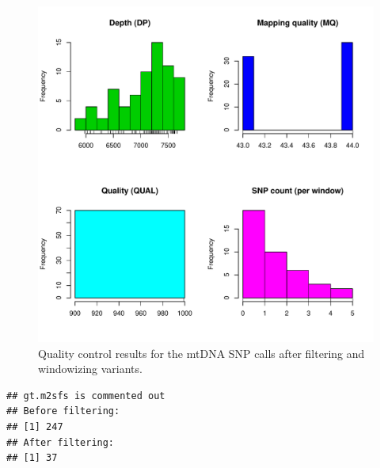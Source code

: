 \documentclass{article}\usepackage[]{graphicx}\usepackage[]{color}
\makeatletter
\def\maxwidth{ %
  \ifdim\Gin@nat@width>\linewidth
    \linewidth
  \else
    \Gin@nat@width
  \fi
}
\newenvironment{kframe}{%
 \def\at@end@of@kframe{}%
 \ifinner\ifhmode%
  \def\at@end@of@kframe{\end{minipage}}%
  \begin{minipage}{\columnwidth}%
 \fi\fi%
 \def\FrameCommand##1{\hskip\@totalleftmargin \hskip-\fboxsep
 \colorbox{shadecolor}{##1}\hskip-\fboxsep
     \hskip-\linewidth \hskip-\@totalleftmargin \hskip\columnwidth}%
 \MakeFramed {\advance\hsize-\width
   \@totalleftmargin\z@ \linewidth\hsize
   \@setminipage}}%
 {\par\unskip\endMakeFramed%
 \at@end@of@kframe}
\newenvironment{knitrout}{}{} %
\makeatother
\begin{document}
\begin{knitrout}
\color{fgcolor}\begin{figure}[p]

\includegraphics[width=\maxwidth]{figure/plot_filter} \caption[Quality control results for the mtDNA SNP calls after filtering and windowizing variants]{Quality control results for the mtDNA SNP calls after filtering and windowizing variants.\label{fig:plot_filter}}
\end{figure}


\end{knitrout}


\begin{knitrout}
\color{fgcolor}\begin{kframe}
\begin{verbatim}
## gt.m2sfs is commented out
## Before filtering:
## [1] 247
## After filtering:
## [1] 37
\end{verbatim}
\end{kframe}
\end{knitrout}
\end{document}
